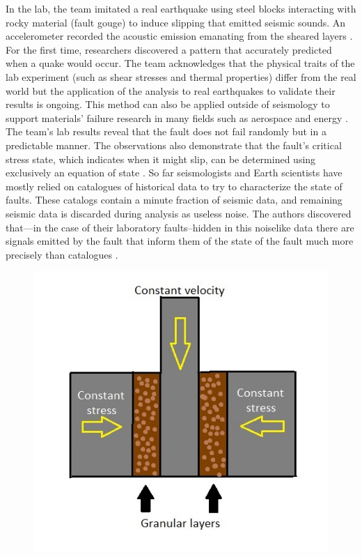 \documentclass[]{llncs} %
\begin{document}
In the lab, the team imitated a real earthquake using steel blocks interacting with rocky material (fault gouge) to induce slipping that emitted seismic sounds. An accelerometer recorded the acoustic emission emanating from the sheared layers \cite{LANLNews}. For the first time, researchers discovered a pattern that accurately predicted when a quake would occur. The team acknowledges that the physical traits of the lab experiment (such as shear stresses and thermal properties) differ from the real world but the application of the analysis to real earthquakes to validate their results is ongoing. This method can also be applied outside of seismology to support materials’ failure research in many fields such as aerospace and energy \cite{LANLNews}. The team’s lab results reveal that the fault does not fail randomly but in a predictable manner. The observations also demonstrate that the fault’s critical stress state, which indicates when it might slip, can be determined using exclusively an equation of state \cite{LANLNews}. So far seismologists and Earth scientists have mostly relied on catalogues of historical data to try to characterize the state of faults. These catalogs contain a minute fraction of seismic data, and remaining seismic data is discarded during analysis as useless noise. The authors discovered that—in the case of their laboratory faults--hidden in this noiselike data there are signals emitted by the fault that inform them of the state of the fault much more precisely than catalogues \cite{LANLNews}. \par

\begin{figure}[h!]
	\centering
	\includegraphics[width=.9\linewidth]{lab}
	\caption{}
	\label{fig:lab}
\end{figure}
\end{document}
